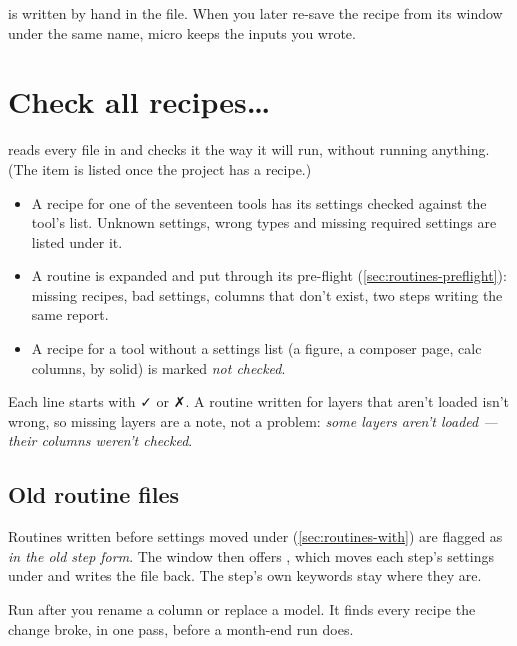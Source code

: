 \begin{tip}
 is written by hand in the file. When you later re-save the recipe from its window under the same name, micro keeps the inputs you wrote.
\end{tip}

\section{Check all recipes…}\label{sec:recipes-checkall}
 reads every file in  and checks it the way it will run, without running anything. (The item is listed once the project has a recipe.)


\begin{itemize}
\item A recipe for one of the seventeen tools has its settings checked against the tool's list. Unknown settings, wrong types and missing required settings are listed under it.
\item A routine is expanded and put through its pre-flight (\cref{sec:routines-preflight}): missing recipes, bad settings, columns that don't exist, two steps writing the same report.
\item A recipe for a tool without a settings list (a figure, a composer page, calc columns, by solid) is marked \emph{not checked}.
\end{itemize}

Each line starts with ✓ or ✗. A routine written for layers that aren't loaded isn't wrong, so missing layers are a note, not a problem: \emph{some layers aren't loaded — their columns weren't checked}.

\subsection{Old routine files}
Routines written before settings moved under  (\cref{sec:routines-with}) are flagged as \emph{in the old step form}. The window then offers , which moves each step's settings under  and writes the file back. The step's own keywords stay where they are.

\begin{tip}
Run  after you rename a column or replace a model. It finds every recipe the change broke, in one pass, before a month-end run does.
\end{tip}
